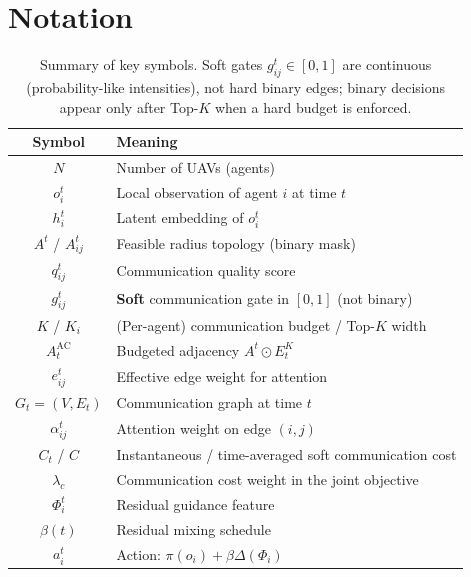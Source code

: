 \section*{Notation}
\label{sec:notation}
\begin{table}[h]
\centering
\caption{Summary of key symbols.
Soft gates $g_{ij}^{t}\!\in\![0,1]$ are continuous (probability-like intensities),
not hard binary edges; binary decisions appear only after Top-$K$ when a hard
budget is enforced.}
\label{tab:notation}
\begin{tabular}{cl}
\toprule
Symbol & Meaning \\
\midrule
$N$ & Number of UAVs (agents) \\
$o_i^{t}$ & Local observation of agent $i$ at time $t$ \\
$h_i^{t}$ & Latent embedding of $o_i^{t}$ \\
$A^{t}$ / $A_{ij}^{t}$ & Feasible radius topology (binary mask) \\
$q_{ij}^{t}$ & Communication quality score \\
$g_{ij}^{t}$ & \textbf{Soft} communication gate in $[0,1]$ (not binary) \\
$K$ / $K_i$ & (Per-agent) communication budget / Top-$K$ width \\
$A_t^{\mathrm{AC}}$ & Budgeted adjacency $A^{t}\odot E_t^{K}$ \\
$e_{ij}^{t}$ & Effective edge weight for attention \\
$G_t=(V,E_t)$ & Communication graph at time $t$ \\
$\alpha_{ij}^{t}$ & Attention weight on edge $(i,j)$ \\
$C_t$ / $C$ & Instantaneous / time-averaged soft communication cost \\
$\lambda_c$ & Communication cost weight in the joint objective \\
$\Phi_i^{t}$ & Residual guidance feature \\
$\beta(t)$ & Residual mixing schedule \\
$a_i^{t}$ & Action: $\pi(o_i)+\beta\Delta(\Phi_i)$ \\
\bottomrule
\end{tabular}
\end{table}
